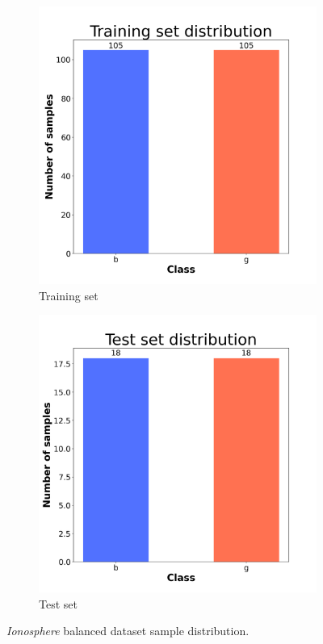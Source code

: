 \begin{figure}[H]
    \centering
    \begin{subfigure}[t]{0.45\textwidth}
        \centering
        \includegraphics[width=1\textwidth]{images/exper1/Ionosphere/train_dist.png}
        \caption{Training set}
    \end{subfigure}
    \begin{subfigure}[t]{0.45\textwidth}
        \centering
        \includegraphics[width=1\textwidth]{images/exper1/Ionosphere/test_dist.png}
        \caption{Test set}
    \end{subfigure}
    \caption{\textit{Ionosphere} balanced dataset sample distribution.}
\end{figure}

